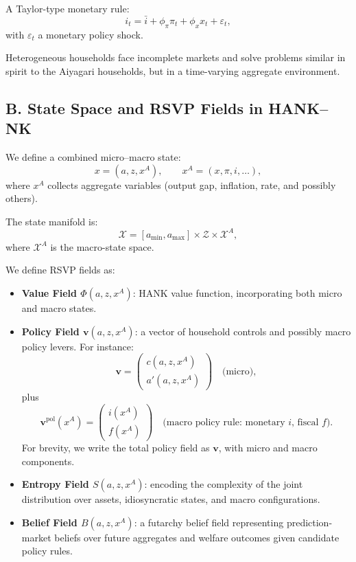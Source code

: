\documentclass[12pt]{article}
\begin{document}
A Taylor-type monetary rule:
\[
i_t = \bar{i} + \phi_\pi \pi_t + \phi_x x_t + \varepsilon_t,
\]
with $\varepsilon_t$ a monetary policy shock.

Heterogeneous households face incomplete markets and solve problems
similar in spirit to the Aiyagari households, but in a time-varying
aggregate environment.

\subsection*{B. State Space and RSVP Fields in HANK--NK}

We define a combined micro--macro state:
\[
x = (a,z,x^A),
\qquad
x^A = (x,\pi,i,\dots),
\]
where $x^A$ collects aggregate variables (output gap, inflation, rate,
and possibly others).

The state manifold is:
\[
\mathcal{X}
=
[a_{\min},a_{\max}]
\times \mathcal{Z}
\times \mathcal{X}^A,
\]
where $\mathcal{X}^A$ is the macro-state space.

We define RSVP fields as:
\begin{itemize}
    \item \textbf{Value Field $\Phi(a,z,x^A)$}: HANK value function,
    incorporating both micro and macro states.
    \item \textbf{Policy Field $\mathbf{v}(a,z,x^A)$}: a vector of
    household controls and possibly macro policy levers. For instance:
    \[
    \mathbf{v} =
    \begin{pmatrix}
        c(a,z,x^A) \\
        a'(a,z,x^A)
    \end{pmatrix}
    \quad
    \text{(micro)},
    \]
    plus
    \[
    \mathbf{v}^{\text{pol}}(x^A)
    =
    \begin{pmatrix}
        i(x^A) \\
        f(x^A)
    \end{pmatrix}
    \quad
    \text{(macro policy rule: monetary $i$, fiscal $f$)}.
    \]
    For brevity, we write the total policy field as $\mathbf{v}$,
    with micro and macro components.
    \item \textbf{Entropy Field $S(a,z,x^A)$}: encoding the complexity of
    the joint distribution over assets, idiosyncratic states, and macro
    configurations.
    \item \textbf{Belief Field $B(a,z,x^A)$}: a futarchy belief field
    representing prediction-market beliefs over future aggregates and
    welfare outcomes given candidate policy rules.
\end{itemize}
\end{document}
